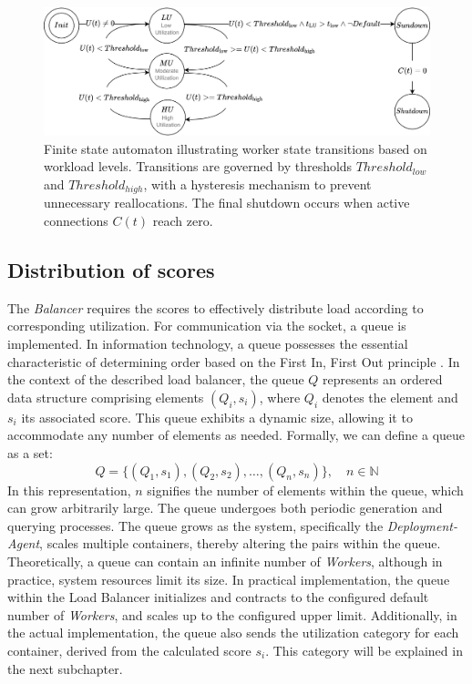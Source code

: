 \documentclass[twocolumn]{webofc}
\begin{document}
\begin{figure}[htbp]
    \centering
    \includegraphics[width=\textwidth]{utilizations.drawio.png}
    \caption{Finite state automaton illustrating worker state transitions based on workload levels. Transitions are governed by thresholds $Threshold_{low}$ and $Threshold_{high}$, with a hysteresis mechanism to prevent unnecessary reallocations. The final shutdown occurs when active connections $C(t)$ reach zero.}
    \label{fig:automat}
\end{figure}

\subsection{Distribution of scores}
The \textit{Balancer} requires the scores to effectively distribute load according to corresponding utilization. For communication via the socket, a queue is implemented. In information technology, a queue possesses the essential characteristic of determining order based on the First In, First Out principle \cite{black2020queue}. In the context of the described load balancer, the queue \( Q \) represents an ordered data structure comprising elements \( (Q_i, s_i) \), where \( Q_i \) denotes the element and \( s_i \) its associated score. This queue exhibits a dynamic size, allowing it to accommodate any number of elements as needed. Formally, we can define a queue as a set:
$$Q = \{ (Q_1, s_1), (Q_2, s_2), \dots, (Q_n, s_n) \}, \quad n \in \mathbb{N}$$
In this representation, \( n \) signifies the number of elements within the queue, which can grow arbitrarily large. The queue undergoes both periodic generation and querying processes. The queue grows as the system, specifically the \textit{Deployment-Agent}, scales multiple containers, thereby altering the pairs within the queue. Theoretically, a queue can contain an infinite number of \textit{Workers}, although in practice, system resources limit its size. In practical implementation, the queue within the Load Balancer initializes and contracts to the configured default number of \textit{Workers}, and scales up to the configured upper limit. Additionally, in the actual implementation, the queue also sends the utilization category for each container, derived from the calculated score \( s_i \). This category will be explained in the next subchapter.
\end{document}
